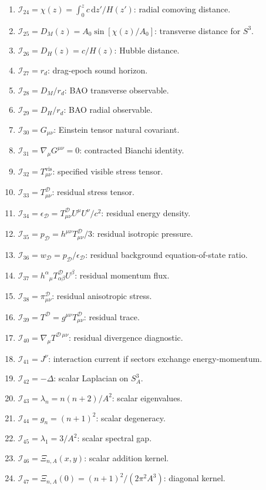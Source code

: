 \documentclass[
  aps,
  prd,
  reprint,
  superscriptaddress,
  nofootinbib,
  floatfix,
  longbibliography
]{revtex4-2}
\newcommand{\D}{\mathcal D}
\newcommand{\vis}{\mathrm{vis}}
\newcommand{\dd}{\mathrm d}
\newcommand{\Inv}{\mathcal I}
\begin{document}
\begin{enumerate}
\item \(\Inv_{24}=\chi(z)=\int_0^z c\,\dd z'/H(z')\): radial comoving distance.
\item \(\Inv_{25}=D_M(z)=A_0\sin[\chi(z)/A_0]\): transverse distance for \(S^3\).
\item \(\Inv_{26}=D_H(z)=c/H(z)\): Hubble distance.
\item \(\Inv_{27}=r_d\): drag-epoch sound horizon.
\item \(\Inv_{28}=D_M/r_d\): BAO transverse observable.
\item \(\Inv_{29}=D_H/r_d\): BAO radial observable.
\item \(\Inv_{30}=G_{\mu\nu}\): Einstein tensor natural covariant.
\item \(\Inv_{31}=\nabla_\mu G^{\mu\nu}=0\): contracted Bianchi identity.
\item \(\Inv_{32}=T^{\vis}_{\mu\nu}\): specified visible stress tensor.
\item \(\Inv_{33}=T^\D_{\mu\nu}\): residual stress tensor.
\item \(\Inv_{34}=\epsilon_\D=T^\D_{\mu\nu}U^\mu U^\nu/c^2\): residual energy density.
\item \(\Inv_{35}=p_\D=h^{\mu\nu}T^\D_{\mu\nu}/3\): residual isotropic pressure.
\item \(\Inv_{36}=w_\D=p_\D/\epsilon_\D\): residual background equation-of-state ratio.
\item \(\Inv_{37}=h^\alpha{}_\mu T^\D_{\alpha\beta}U^\beta\): residual momentum flux.
\item \(\Inv_{38}=\pi^\D_{\mu\nu}\): residual anisotropic stress.
\item \(\Inv_{39}=T^\D=g^{\mu\nu}T^\D_{\mu\nu}\): residual trace.
\item \(\Inv_{40}=\nabla_\mu T^{\D\,\mu\nu}\): residual divergence diagnostic.
\item \(\Inv_{41}=J^\nu\): interaction current if sectors exchange energy-momentum.
\item \(\Inv_{42}=-\Delta\): scalar Laplacian on \(S^3_A\).
\item \(\Inv_{43}=\lambda_n=n(n+2)/A^2\): scalar eigenvalues.
\item \(\Inv_{44}=g_n=(n+1)^2\): scalar degeneracy.
\item \(\Inv_{45}=\lambda_1=3/A^2\): scalar spectral gap.
\item \(\Inv_{46}=\Xi_{n,A}(x,y)\): scalar addition kernel.
\item \(\Inv_{47}=\Xi_{n,A}(0)=(n+1)^2/(2\pi^2A^3)\): diagonal kernel.

\end{enumerate}
\end{document}
